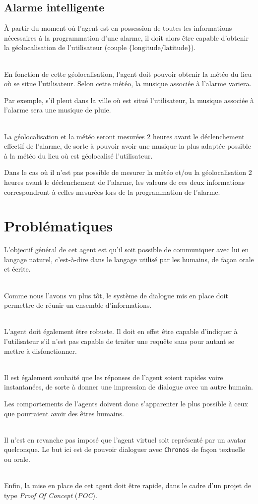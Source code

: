 \subsection{Alarme intelligente}
\`A partir du moment où l'agent est en possession de toutes les informations nécessaires à la programmation d'une alarme, il doit alors être capable d'obtenir la géolocalisation de l'utilisateur (couple $\{\text{longitude} / \text{latitude} \}$). 

~\\\indent 
En fonction de cette géolocalisation, l'agent doit pouvoir obtenir la météo du lieu où se situe l'utilisateur. Selon cette météo, la musique associée à l'alarme variera. 

Par exemple, s'il pleut dans la ville où est situé l'utilisateur, la musique associée à l'alarme sera une musique de pluie.

~\\\indent
La géolocalisation et la météo seront mesurées 2 heures avant le déclenchement effectif de l'alarme, de sorte à pouvoir avoir une musique la plus adaptée possible à la météo du lieu où est géolocalisé l'utilisateur.

Dans le cas où il n'est pas possible de mesurer la météo et/ou la géolocalisation 2 heures avant le déclenchement de l'alarme, les valeurs de ces deux informations correspondront à celles mesurées lors de la programmation de l'alarme.




\section{Problématiques}
L'objectif général de cet agent est qu'il soit possible de communiquer avec lui en langage naturel, c'est-à-dire dans le langage utilisé par les humains, de façon orale et écrite. 

~\\\indent
Comme nous l'avons vu plus tôt, le système de dialogue mis en place doit permettre de réunir un ensemble d'informations.

~\\\indent
L'agent doit également être robuste. Il doit en effet être capable d'indiquer à l'utilisateur s'il n'est pas capable de traiter une requête sans pour autant se mettre à disfonctionner.

~\\\indent 
Il est également souhaité que les réponses de l'agent soient rapides voire instantanées, de sorte à donner une impression de dialogue avec un autre humain. 

Les comportements de l'agents doivent donc s'apparenter le plus possible à ceux que pourraient avoir des êtres humains.

~\\\indent
Il n'est en revanche pas imposé que l'agent virtuel soit représenté par un avatar quelconque. Le but ici est de pouvoir dialoguer avec \texttt{Chronos} de façon textuelle ou orale.

~\\\indent 
Enfin, la mise en place de cet agent doit être rapide, dans le cadre d'un projet de type \emph{Proof Of Concept} (\emph{POC}).


